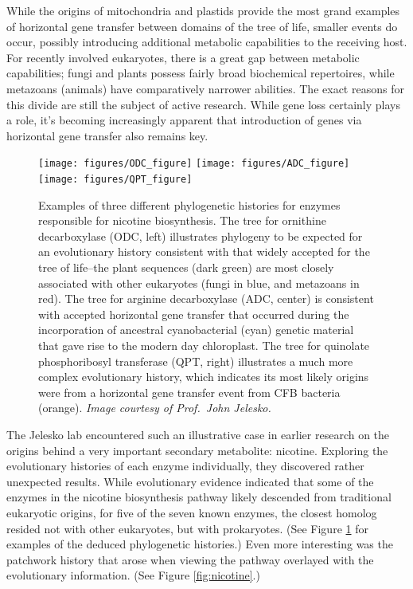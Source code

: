 \documentclass[11pt,letterpaper,twoside,english]{article}
\begin{document}
While the origins of mitochondria and plastids provide the most grand examples
of horizontal gene transfer between domains of the tree of life, smaller
events do occur, possibly introducing additional metabolic capabilities to the
receiving host. For recently involved eukaryotes, there is a great gap between
metabolic capabilities; fungi and plants possess fairly broad biochemical
repertoires, while metazoans (animals) have comparatively narrower abilities.
The exact reasons for this divide are still the subject of active research.
While gene loss certainly plays a role, it's becoming increasingly apparent
that introduction of genes via horizontal gene transfer also remains key.

\begin{figure}[tbhp]
    \begin{center}
        \texttt{[image: figures/ODC\_figure]}
        \hspace{0.02\linewidth}
        \texttt{[image: figures/ADC\_figure]}
        \hspace{0.02\linewidth}
        \texttt{[image: figures/QPT\_figure]}
    \end{center}
    \caption{Examples of three different phylogenetic histories for enzymes
    responsible for nicotine biosynthesis. The tree for ornithine
    decarboxylase (ODC, left) illustrates phylogeny to be expected for an
    evolutionary history consistent with that widely accepted for the tree of
    life--the plant sequences (dark green) are most closely associated with
    other eukaryotes (fungi in blue, and metazoans in red). The tree for
    arginine decarboxylase (ADC, center) is consistent with accepted
    horizontal gene transfer that occurred during the incorporation of
    ancestral cyanobacterial (cyan) genetic material that gave rise to the
    modern day chloroplast. The tree for quinolate phosphoribosyl transferase
    (QPT, right) illustrates a much more complex evolutionary history, which
    indicates its most likely origins were from a horizontal gene transfer
    event from CFB bacteria (orange). \textit{Image courtesy of Prof.~John
    Jelesko.}}
    \label{fig:phylo_histories}
\end{figure}

The Jelesko lab encountered such an illustrative case in earlier research on
the origins behind a very important secondary metabolite: nicotine.  Exploring
the evolutionary histories of each enzyme individually, they discovered rather
unexpected results. While evolutionary evidence indicated that some of the
enzymes in the nicotine biosynthesis pathway likely descended from traditional
eukaryotic origins, for five of the seven known enzymes, the closest homolog
resided not with other eukaryotes, but with prokaryotes. (See Figure
\ref{fig:phylo_histories} for examples of the deduced phylogenetic histories.)
Even more interesting was the patchwork history that arose when viewing the
pathway overlayed with the evolutionary information. (See Figure
\ref{fig:nicotine}.)
\end{document}
